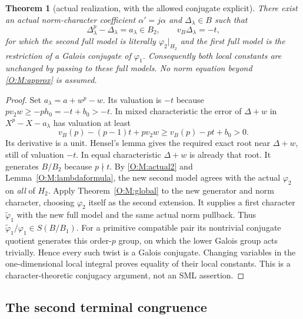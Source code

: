 \documentclass[11pt]{amsart}
\newtheorem{theorem}{Theorem}[section]
\theoremstyle{definition}
\theoremstyle{remark}
\begin{document}
\begin{theorem}[actual realization, with the allowed conjugate explicit]
\label{O:M:realize}
There exist an actual norm-character coefficient $\alpha'=j\alpha$ and
$\Delta_\lambda\in B$ such that
\[
 \Delta_\lambda^p-\Delta_\lambda=a_\lambda\in B_2,\qquad
 v_B\Delta_\lambda=-t,
\]
for which the second full model is literally $\varphi_2|_{H_2}$ and the
first full model is the restriction of a Galois conjugate of $\varphi_1$.
Consequently both local constants are unchanged by passing to these full
models. No norm equation beyond \eqref{O:M:approx} is assumed.
\end{theorem}
\begin{proof}
Set $a_\lambda=a+w^p-w$. Its valuation is $-t$ because
$pv_2w\ge-ph_0=-t+b_0>-t$. In mixed characteristic the error of
$\Delta+w$ in $X^p-X-a_\lambda$ has valuation at least
\[
 v_B(p)-(p-1)t+pv_2w\ge v_B(p)-pt+b_0>0.
\]
Its derivative is a unit. Hensel's lemma gives the required exact root
near $\Delta+w$, still of valuation $-t$. In equal characteristic
$\Delta+w$ is already that root. It generates $B/B_2$ because $p\nmid t$.
By \eqref{O:M:actual2} and Lemma~\ref{O:M:lambdaformula}, the new second model
agrees with the actual $\varphi_2$ on \emph{all} of $H_2$.
Apply Theorem~\ref{O:M:global} to the new generator and norm character, choosing
$\varphi_2$ itself as the second extension. It supplies a first character
$\widetilde\varphi_1$ with the new full model and the same actual norm
pullback. Thus $\widetilde\varphi_1/\varphi_1\in S(B/B_1)$.
For a primitive compatible pair its nontrivial conjugate quotient generates
this order-$p$ group, on which the lower Galois group acts trivially.
Hence every such twist is a Galois conjugate. Changing variables in the
one-dimensional local integral proves equality of their local constants.
This is a character-theoretic conjugacy argument, not an SML assertion.
\end{proof}


\subsection{The second terminal congruence}\label{O:sec:r2}
\end{document}

